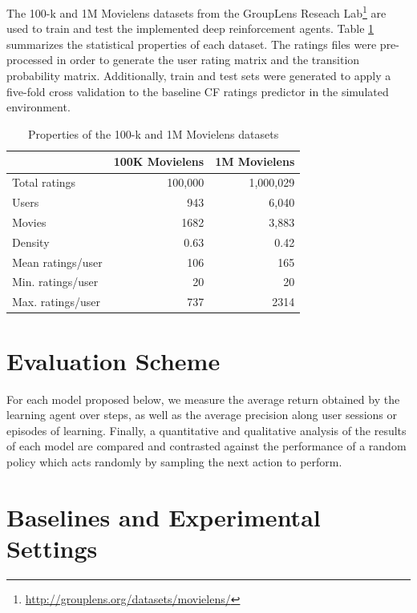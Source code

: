 The 100-k and 1M Movielens datasets \cite{harper2016movielens} from the GroupLens Reseach Lab\footnote{\url{http://grouplens.org/datasets/movielens/}} are used to train and test the implemented deep reinforcement agents. Table \ref{table:dataset} summarizes the statistical properties of each dataset. The ratings files were pre-processed in order to generate the user rating matrix and the transition probability matrix. Additionally, train and test sets were generated to apply a five-fold cross validation to the baseline CF ratings predictor in the simulated environment.

\begin{table}[!htbp]
\centering
\begin{tabular}{ |l|r|r| }
  \hline
  & 100K Movielens & 1M Movielens \\
  \hline
  Total ratings & 100,000 & 1,000,029 \\
  Users & 943 & 6,040 \\
  Movies & 1682 & 3,883 \\
  Density & 0.63 & 0.42 \\
  Mean ratings/user & 106 & 165 \\
  Min. ratings/user & 20 & 20 \\
  Max. ratings/user & 737 & 2314 \\
  \hline
\end{tabular}
\caption{Properties of the 100-k and 1M Movielens datasets}
\label{table:dataset}
\end{table}

\section{Evaluation Scheme}

For each model proposed below, we measure the average return obtained by the learning agent over steps, as well as the average precision along user sessions or episodes of learning. Finally, a quantitative and qualitative analysis of the results of each model are compared and contrasted against the performance of a random policy which acts randomly by sampling the next action to perform.

\section{Baselines and Experimental Settings}

